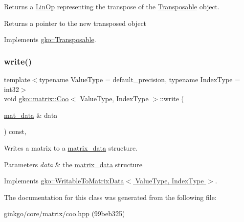 Returns a \hyperlink{classgko_1_1LinOp}{Lin\+Op} representing the transpose of the \hyperlink{classgko_1_1Transposable}{Transposable} object. 

\begin{DoxyReturn}{Returns}
a pointer to the new transposed object 
\end{DoxyReturn}


Implements \hyperlink{classgko_1_1Transposable_a5c6b778b71b47d53e0bda6ccf894d318}{gko\+::\+Transposable}.

\mbox{\label{classgko_1_1matrix_1_1Coo_ae193466ca1a4a3c7d1383ddc5a2701ab}} 
\subsubsection{\texorpdfstring{write()}{write()}}
{\footnotesize\ttfamily template$<$typename Value\+Type = default\+\_\+precision, typename Index\+Type = int32$>$ \\
void \hyperlink{classgko_1_1matrix_1_1Coo}{gko\+::matrix\+::\+Coo}$<$ Value\+Type, Index\+Type $>$\+::write (\begin{DoxyParamCaption}\item[{\hyperlink{structgko_1_1matrix__data}{mat\+\_\+data} \&}]{data }\end{DoxyParamCaption}) const\hspace{0.3cm}{\ttfamily [override]}, {\ttfamily [virtual]}}



Writes a matrix to a \hyperlink{structgko_1_1matrix__data}{matrix\+\_\+data} structure. 


\begin{DoxyParams}{Parameters}
{\em data} & the \hyperlink{structgko_1_1matrix__data}{matrix\+\_\+data} structure \\
\hline
\end{DoxyParams}


Implements \hyperlink{classgko_1_1WritableToMatrixData_a96036c3a4bf4c67fa93002808b8b14e2}{gko\+::\+Writable\+To\+Matrix\+Data$<$ Value\+Type, Index\+Type $>$}.



The documentation for this class was generated from the following file\+:\begin{DoxyCompactItemize}
\item 
ginkgo/core/matrix/coo.\+hpp (99beb325)\end{DoxyCompactItemize}
